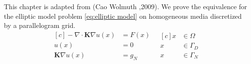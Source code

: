 \documentclass[../Main/main.tex]{subfiles}
\begin{document}
	

	
		This chapter is adapted from (Cao Wolmuth \cite{https://doi.org/10.1002/num.20525},2009).
		We prove the equivalence for the elliptic model problem \eqref{eq:elliptic model} on homogeneous media discretized by a parallelogram grid.
	\begin{equation}\label{eq:elliptic model 2}
		\begin{aligned}[c]
			- \nabla \cdot \pmb{K} \nabla u(x) &= F(x) \\
			u(x) &= 0 \\
			\pmb{K}\nabla u(x) &= g_N
		\end{aligned}
		\ \ \
		\begin{aligned}[c]
			x &\in \Omega  \\
			x &\in \Gamma_D \\
			x &\in \Gamma_N
		\end{aligned}
	\end{equation}	

	
\end{document}
